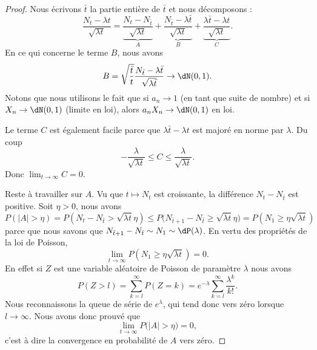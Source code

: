 \begin{proof}
    Nous écrivons \( \bar t\) la partie entière de \( \bar t\) et nous décomposons :
    \begin{equation}
        \frac{ N_t-\lambda t }{ \sqrt{\lambda t} }=\underbrace{\frac{ N_t-N_{\bar t} }{ \sqrt{\lambda t} }}_A+\underbrace{\frac{ N_{\bar t}-\lambda \bar t }{ \sqrt{\lambda t} }}_B+\underbrace{\frac{ \lambda \bar t-\lambda t }{ \sqrt{\lambda t} }}_C.
    \end{equation}
    En ce qui concerne le terme \( B\), nous avons
    \begin{equation}
        B=\sqrt{\frac{ \bar t }{ t }}\frac{ N_{\bar t}-\lambda \bar t }{ \sqrt{\lambda \bar t} }\to\dN(0,1).
    \end{equation}
    Notons que nous utilisons le fait que si \( a_n\to 1\) (en tant que suite de nombre) et si \( X_n\to\dN(0,1)\) (limite en loi), alors \( a_nX_n\to \dN(0,1)\) en loi.

    Le terme \( C\) est également facile parce que \( \lambda \bar t-\lambda t\) est majoré en norme par \( \lambda\). Du coup
    \begin{equation}
        -\frac{ \lambda }{ \sqrt{\lambda t} }\leq C\leq \frac{ \lambda }{ \sqrt{\lambda t} }.
    \end{equation}
    Donc $\lim_{t\to \infty} C=0$.

    Reste à travailler sur \( A\). Vu que \( t\mapsto N_t\) est croissante, la différence \( N_t-N_{\bar t}\) est positive. Soit \( \eta>0\), nous avons
    \begin{equation}
        P(| A |>\eta)=P(N_t-N_{\bar t}>\sqrt{\lambda t}\eta)\leq P\big( N_{\bar t+1}-N_{\bar t}\geq \sqrt{\lambda t}\eta \big)=P(N_1\geq \eta\sqrt{\lambda t})
    \end{equation}
    parce que nous savons que $N_{\bar t+1}-N_{\bar t}\sim N_1\sim\dP(\lambda)$. En vertu des propriétés de la loi de Poisson,
    \begin{equation}
        \lim_{t\to \infty}P(N_1\geq \eta\sqrt{\lambda t})=0.
    \end{equation}
    En effet si \( Z\) est une variable aléatoire de Poisson de paramètre \( \lambda\) nous avons
    \begin{equation}
        P(Z>l)=\sum_{k=l}^{\infty}P(Z=k)= e^{-\lambda}\sum_{k=l}^{\infty}\frac{ \lambda^k }{ k! }.
    \end{equation}
    Nous reconnaissons la queue de série de \(  e^{\lambda}\), qui tend donc vers zéro lorsque \( l\to \infty\). Nous avons donc prouvé que
    \begin{equation}
        \lim_{t\to \infty} P\big( | A |>\eta \big)=0,
    \end{equation}
    c'est à dire la convergence en probabilité de \( A\) vers zéro.


\end{proof}
